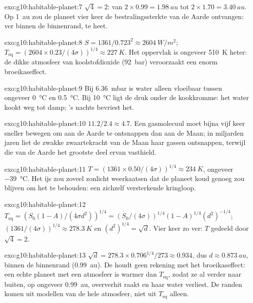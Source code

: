 \begin{solution}{exo:g10:habitable-planet:7}
$\sqrt 4 = 2$: van $2 \times 0.99 = \qty{1.98}{au}$ tot $2 \times 1.70 =
\qty{3.40}{au}$. Op \qty{1}{au} zou de planeet vier keer de bestralingssterkte
van de Aarde ontvangen: ver binnen de binnenrand, te heet.
\end{solution}

\begin{solution}{exo:g10:habitable-planet:8}
$S = 1361/0.723^2 \approx \qty{2604}{W/m^2}$;
$T_{\mathrm{eq}} = (2604 \times 0.23/(4\sigma))^{1/4} \approx \qty{227}{K}$.
Het oppervlak is ongeveer \qty{510}{K} heter: de dikke atmosfeer van
koolstofdioxide (\qty{92}{bar}) veroorzaakt een enorm broeikaseffect.
\end{solution}

\begin{solution}{exo:g10:habitable-planet:9}
Bij \qty{6.36}{mbar} is water alleen vloeibaar tussen ongeveer
\qty{0}{\degreeCelsius} en \qty{0.5}{\degreeCelsius}. Bij \qty{10}{\degreeCelsius}
ligt de druk onder de kookkromme: het water kookt weg tot damp; 's nachts bevriest het.
\end{solution}

\begin{solution}{exo:g10:habitable-planet:10}
$11.2/2.4 \approx 4.7$. Een gasmolecuul moet bijna vijf keer sneller bewegen
om aan de Aarde te ontsnappen dan aan de Maan; in miljarden jaren liet de
zwakke zwaartekracht van de Maan haar gassen ontsnappen, terwijl die van de
Aarde het grootste deel ervan vasthield.
\end{solution}

\begin{solution}{exo:g10:habitable-planet:11}
$T = (1361 \times 0.50/(4\sigma))^{1/4} \approx \qty{234}{K}$, ongeveer
\qty{-39}{\degreeCelsius}. Het ijs zou zoveel zonlicht weerkaatsen dat de
planeet koud genoeg zou blijven om het te behouden: een zichzelf versterkende kringloop.
\end{solution}

\begin{solution}{exo:g10:habitable-planet:12}
$T_{\mathrm{eq}} = (S_0(1-A)/(4\sigma d^2))^{1/4} = (S_0/(4\sigma))^{1/4}
(1-A)^{1/4} (d^2)^{-1/4}$; $(1361/(4\sigma))^{1/4} \approx \qty{278.3}{K}$ en
$(d^2)^{1/4} = \sqrt d$. Vier keer zo ver: $T$ gedeeld door $\sqrt 4 = 2$.
\end{solution}

\begin{solution}{exo:g10:habitable-planet:13}
$\sqrt d = 278.3 \times 0.706^{1/4}/273 \approx 0.934$, dus $d \approx
\qty{0.873}{au}$, binnen de binnenrand (\qty{0.99}{au}). De
 houdt geen rekening met het broeikaseffect: een echte
planeet met een atmosfeer is warmer dan $T_{\mathrm{eq}}$, zodat ze al verder
naar buiten, op ongeveer \qty{0.99}{au}, oververhit raakt en haar water
verliest. De randen komen uit modellen van de hele atmosfeer, niet uit
$T_{\mathrm{eq}}$ alleen.
\end{solution}

